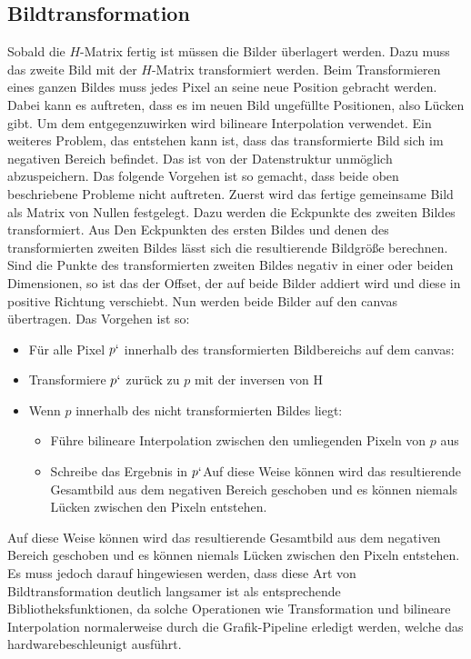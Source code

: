 \subsection{Bildtransformation}
Sobald die $H$-Matrix fertig ist müssen die Bilder überlagert werden. Dazu muss das zweite Bild mit der $H$-Matrix transformiert werden. Beim Transformieren eines ganzen Bildes muss jedes Pixel an seine neue Position gebracht werden. Dabei kann es auftreten, dass es im neuen Bild ungefüllte Positionen, also Lücken gibt. Um dem entgegenzuwirken wird bilineare Interpolation verwendet. Ein weiteres Problem, das entstehen kann ist, dass das transformierte Bild sich im negativen Bereich befindet. Das ist von der Datenstruktur unmöglich abzuspeichern. Das folgende Vorgehen ist so gemacht, dass beide oben beschriebene Probleme nicht auftreten.
Zuerst wird das fertige gemeinsame Bild als Matrix von Nullen festgelegt. Dazu werden die Eckpunkte des zweiten Bildes transformiert. Aus Den Eckpunkten des ersten Bildes und denen des transformierten zweiten Bildes lässt sich die resultierende Bildgröße berechnen. Sind die Punkte des transformierten zweiten Bildes negativ in einer oder beiden Dimensionen, so ist das der Offset, der auf beide Bilder addiert wird und diese in positive Richtung verschiebt.
Nun werden beide Bilder auf den canvas übertragen. Das Vorgehen ist so:


\begin{itemize}
\item Für alle Pixel $p`$ innerhalb des transformierten Bildbereichs auf dem canvas:
\item Transformiere $p`$ zurück zu $p$ mit der inversen von H
\item Wenn $p$ innerhalb des nicht transformierten Bildes liegt:
\begin{itemize}
    \item Führe bilineare Interpolation zwischen den umliegenden Pixeln von $p$ aus
    \item  Schreibe das Ergebnis in $p`$Auf diese Weise können wird das resultierende Gesamtbild aus  dem negativen Bereich geschoben und es können niemals Lücken zwischen den Pixeln entstehen.
\end{itemize}

\end{itemize}

Auf diese Weise können wird das resultierende Gesamtbild aus dem negativen Bereich geschoben und es können niemals Lücken zwischen den Pixeln entstehen. Es muss jedoch darauf hingewiesen werden, dass diese Art von Bildtransformation deutlich langsamer ist als entsprechende Bibliotheksfunktionen, da solche Operationen wie Transformation und bilineare Interpolation normalerweise durch die Grafik-Pipeline erledigt werden, welche das hardwarebeschleunigt ausführt.

\clearpage